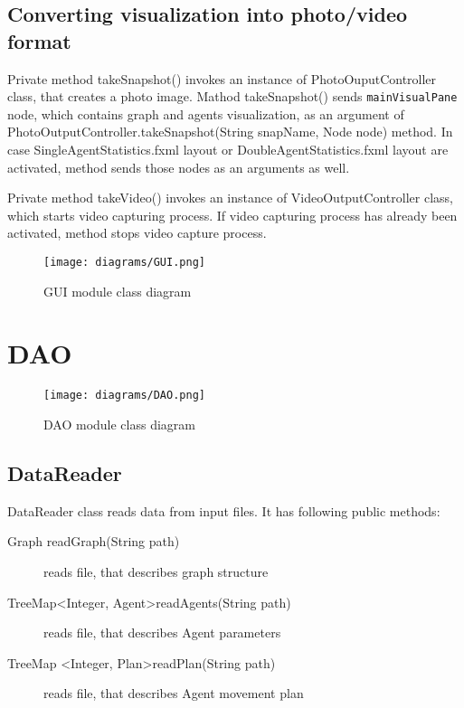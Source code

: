 \documentclass[thesis=B,english]{FITthesis}[2019/12/23]
\begin{document}
\subsection{Converting visualization into photo/video format}

Private method takeSnapshot() invokes an instance of PhotoOuputController class, that
creates a photo image. Mathod takeSnapshot() sends \verb|mainVisualPane| node, which contains graph and agents visualization, as an argument of  PhotoOutputController.takeSnapshot(String snapName, Node node) method. In case SingleAgentStatistics.fxml layout or DoubleAgentStatistics.fxml layout are activated, method sends those nodes as an arguments as well.

Private method takeVideo() invokes an instance of VideoOutputController class, which starts video capturing process. If video capturing process has already been activated, method stops video capture process. 

\begin{figure}
	\texttt{[image: diagrams/GUI.png]}
	\caption[GUI module class diagram]{GUI module class diagram}\label{fig:float17}
\end{figure}

\section{DAO}

\begin{figure}
	\texttt{[image: diagrams/DAO.png]}
	\caption[DAO module class diagram]{DAO module class diagram}\label{fig:float18}
\end{figure}

\subsection{DataReader}

DataReader class reads data from input files. It has following public methods:
\begin{description}
\item[Graph readGraph(String path)] reads file, that describes graph structure
\item[TreeMap\textless Integer, Agent\textgreater readAgents(String path)] reads file, that describes Agent parameters
\item[TreeMap \textless Integer, Plan\textgreater readPlan(String path)] reads file, that describes Agent movement plan
\end{description}
\end{document}
